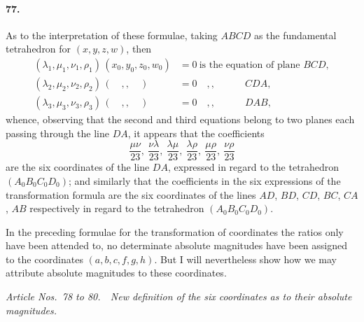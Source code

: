 \documentclass[11pt,a4paper]{article}
\begin{document}
\paragraph{77.}
As to the interpretation of these formulae, taking $ABCD$ as the fundamental
tetrahedron for $(x, y, z, w)$, then
\begin{align*}
(\lambda_1, \mu_1, \nu_1, \rho_1)\,(x_0, y_0, z_0, w_0) &= 0\ \text{is the equation of plane } BCD, \\
(\lambda_2, \mu_2, \nu_2, \rho_2)\,(\quad,,\quad) &= 0\quad ,, \quad\quad\quad CDA, \\
(\lambda_3, \mu_3, \nu_3, \rho_3)\,(\quad,,\quad) &= 0\quad ,, \quad\quad\quad DAB,
\end{align*}
whence, observing that the second and third equations belong to two planes each
passing through the line $DA$, it appears that the coefficients
\[
\frac{\mu\nu}{23},\ \frac{\nu\lambda}{23},\ \frac{\lambda\mu}{23},\
 \frac{\lambda\rho}{23},\ \frac{\mu\rho}{23},\ \frac{\nu\rho}{23}
\]
are the six coordinates of the line $DA$, expressed in regard to the tetrahedron
$(A_0 B_0 C_0 D_0)$; and similarly that the coefficients in the six expressions of the
transformation formula are the six coordinates of the lines $AD$, $BD$, $CD$, $BC$, $CA$,
$AB$ respectively in regard to the tetrahedron $(A_0 B_0 C_0 D_0)$.

In the preceding formulae for the transformation of coordinates the ratios only have
been attended to, no determinate absolute magnitudes have been assigned to the
coordinates $(a,b,c,f,g,h)$. But I will nevertheless show how we may attribute
absolute magnitudes to these coordinates.

\bigskip
\begin{center}
\textit{Article Nos.\ 78 to 80.\ \ New definition of the six coordinates as to their absolute magnitudes.}
\end{center}
\end{document}
